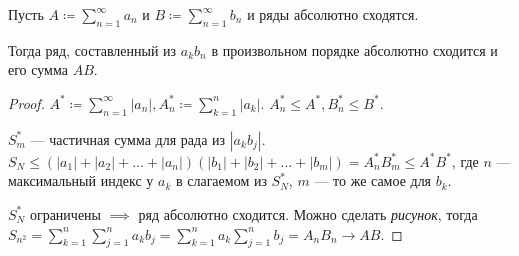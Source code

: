 \begin{theorem}
    Пусть $A \coloneqq \sum\limits_{n=1}^\infty a_n$ и  $B \coloneqq \sum\limits_{n=1}^\infty b_n$ и ряды абсолютно сходятся.

    Тогда ряд, составленный из  $a_kb_n$ в произвольном порядке абсолютно сходится и его сумма  $AB$.
\end{theorem}
\begin{proof}
    $A^* \coloneqq \sum\limits_{n=1}^\infty |a_n|, A_n^* \coloneqq \sum\limits_{k=1}^n |a_k|$.  $A^*_n \le A^*, B_n^* \le B^*$.

    $S_m^*$ --- частичная сумма для рада из  $|a_kb_j|$. $S_N \le (|a_1| + |a_2| + \ldots + |a_n|)(|b_1| + |b_2| + \ldots + |b_m|) = A_n^* B_m^* \le A^* B^*$, где $n$ --- максимальный индекс у  $a_k$ в слагаемом из  $S_N^*$, $m$ --- то же самое для  $b_k$.

    $S_N^*$ ограничены $\implies$ ряд абсолютно сходится. Можно сделать \textit{рисунок}, тогда $S_{n^2} = \sum\limits_{k=1}^n \sum\limits_{j=1}^n a_k b_j = \sum\limits_{k=1}^n a_k \sum\limits_{j=1}^n b_j = A_nB_n \to AB$. 
\end{proof}

